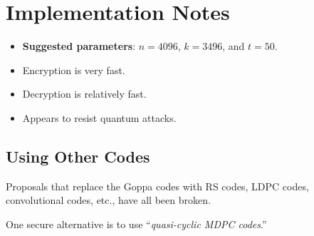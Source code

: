 \section{Implementation Notes}
\begin{itemize}
      \item \textbf{Suggested parameters}: $ n=4096 $, $ k=3496 $, and $ t=50 $.
      \item Encryption is very fast.
      \item Decryption is relatively fast.
      \item Appears to resist quantum attacks.
\end{itemize}
\subsection*{Using Other Codes}
Proposals that replace the Goppa codes with RS codes, LDPC codes,
convolutional codes, etc., have all been broken.

One secure alternative is to use ``\emph{quasi-cyclic MDPC codes}.''
